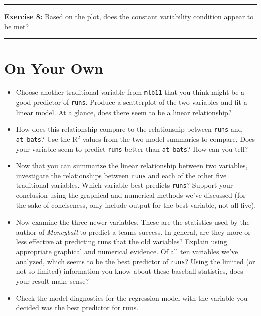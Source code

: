\documentclass[]{book}
\theoremstyle{definition}
\theoremstyle{definition}
\theoremstyle{definition}
\theoremstyle{remark}
\begin{document}
\begin{center}\rule{0.5\linewidth}{\linethickness}\end{center}

\textbf{Exercise 8:} Based on the plot, does the constant variability
condition appear to be met?

\begin{center}\rule{0.5\linewidth}{\linethickness}\end{center}

\section{On Your Own}\label{on-your-own-7}

\begin{itemize}
\item
  Choose another traditional variable from \texttt{mlb11} that you think
  might be a good predictor of \texttt{runs}. Produce a scatterplot of
  the two variables and fit a linear model. At a glance, does there seem
  to be a linear relationship?
\item
  How does this relationship compare to the relationship between
  \texttt{runs} and \texttt{at\_bats}? Use the R\(^2\) values from the
  two model summaries to compare. Does your variable seem to predict
  \texttt{runs} better than \texttt{at\_bats}? How can you tell?
\item
  Now that you can summarize the linear relationship between two
  variables, investigate the relationships between \texttt{runs} and
  each of the other five traditional variables. Which variable best
  predicts \texttt{runs}? Support your conclusion using the graphical
  and numerical methods we've discussed (for the sake of conciseness,
  only include output for the best variable, not all five).
\item
  Now examine the three newer variables. These are the statistics used
  by the author of \emph{Moneyball} to predict a teams success. In
  general, are they more or less effective at predicting runs that the
  old variables? Explain using appropriate graphical and numerical
  evidence. Of all ten variables we've analyzed, which seems to be the
  best predictor of \texttt{runs}? Using the limited (or not so limited)
  information you know about these baseball statistics, does your result
  make sense?
\item
  Check the model diagnostics for the regression model with the variable
  you decided was the best predictor for runs.
\end{itemize}
\end{document}
